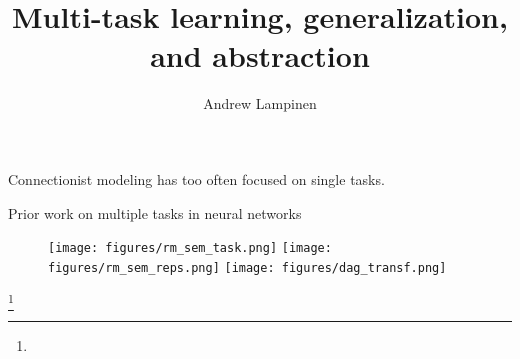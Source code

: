 \documentclass{beamer}
\newcommand\blfootnote[1]{%
  \begingroup
  \renewcommand\thefootnote{}\footnote{#1}%
  \addtocounter{footnote}{-1}%
  \endgroup
}
\begin{document}
\title{Multi-task learning, generalization, and abstraction}
\author{Andrew Lampinen}
\date{}
\frame{\titlepage}

\begin{frame}[standout]
Connectionist modeling has too often focused on single tasks.\par
\end{frame}

\begin{frame}{Prior work on multiple tasks in neural networks}
\begin{figure}
\centering
{} {
\texttt{[image: figures/rm\_sem\_task.png]}
}  {
\texttt{[image: figures/rm\_sem\_reps.png]}
}  {
\texttt{[image: figures/dag\_transf.png]}
}
\end{figure}
\blfootnote{
    \only<3->{\citep{Dienes1999}}
}
\end{frame}
\end{document}
